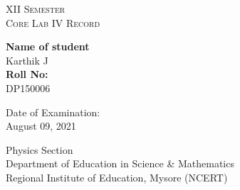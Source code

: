 \documentclass[12pt]{book}
\author{Karthik}
\date{}
\begin{document}

	\begin{titlepage}
		\begin{center}
			\vspace*{1cm}
			
			\begin{tcolorbox}
				\begin{center}
					{\LARGE\textsc{XII Semester\\\vspace{5pt}Core Lab IV Record}}
				\end{center}
			\end{tcolorbox}
			
			\vspace{0.5cm}
			
			\vspace{1.5cm}
			
			\textbf{Name of student}\\
			Karthik J\\
			\vspace{0.5cm}
			\textbf{Roll No:}\\
			DP150006
			
			\vfill
			
			Date of Examination:\\
			August 09, 2021
			
			
			\vspace{0.8cm}
			
			Physics Section\\
			Department of Education in Science \& Mathematics\\
			Regional Institute of Education, Mysore (NCERT)\\
			
		\end{center}
	\end{titlepage}

\end{document}
